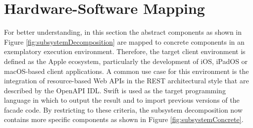 \section{Hardware-Software Mapping}
\label{sec:HardwareSoftwareMapping}

For better understanding, in this section the abstract components as shown in Figure \ref{fig:subsystemDecomposition} are mapped to concrete components in an exemplatory execution environment. Therefore, the target client environment is defined as the Apple ecosystem, particularly the development of iOS, iPadOS or macOS-based client applications.  A common use case for this environment is the integration of resource-based Web APIs in the REST architectural style that are described by the OpenAPI \ac{IDL}. Swift is used as the target programming language in which to output the result and to import previous versions of the facade code. By restricting to these criteria, the subsystem decomposition now contains more specific components as shown in Figure \ref{fig:subsystemConcrete}. 

\begin{figure}[!h]
\end{figure}

